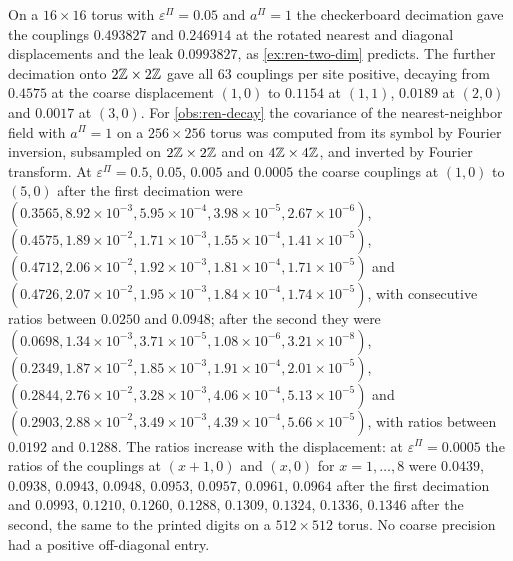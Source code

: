 \begin{numcheck}[Decimation on $\Z^2$]\label{chk:ren-two-dim}
On a $16\times16$ torus with $\varepsilon^\Pi=0.05$ and $a^\Pi=1$ the checkerboard decimation gave the couplings $0.493827$ and $0.246914$ at the rotated nearest and diagonal displacements and the leak $0.0993827$, as \cref{ex:ren-two-dim} predicts. The further decimation onto $2\mathbb{Z}\times2\mathbb{Z}$ gave all $63$ couplings per site positive, decaying from $0.4575$ at the coarse displacement $(1,0)$ to $0.1154$ at $(1,1)$, $0.0189$ at $(2,0)$ and $0.0017$ at $(3,0)$. For \cref{obs:ren-decay} the covariance of the nearest-neighbor field with $a^\Pi=1$ on a $256\times256$ torus was computed from its symbol by Fourier inversion, subsampled on $2\mathbb{Z}\times2\mathbb{Z}$ and on $4\mathbb{Z}\times4\mathbb{Z}$, and inverted by Fourier transform. At $\varepsilon^\Pi=0.5$, $0.05$, $0.005$ and $0.0005$ the coarse couplings at $(1,0)$ to $(5,0)$ after the first decimation were $(0.3565,8.92\times10^{-3},5.95\times10^{-4},3.98\times10^{-5},2.67\times10^{-6})$, $(0.4575,1.89\times10^{-2},1.71\times10^{-3},1.55\times10^{-4},1.41\times10^{-5})$, $(0.4712,2.06\times10^{-2},1.92\times10^{-3},1.81\times10^{-4},1.71\times10^{-5})$ and $(0.4726,2.07\times10^{-2},1.95\times10^{-3},1.84\times10^{-4},1.74\times10^{-5})$, with consecutive ratios between $0.0250$ and $0.0948$; after the second they were $(0.0698,1.34\times10^{-3},3.71\times10^{-5},1.08\times10^{-6},3.21\times10^{-8})$, $(0.2349,1.87\times10^{-2},1.85\times10^{-3},1.91\times10^{-4},2.01\times10^{-5})$, $(0.2844,2.76\times10^{-2},3.28\times10^{-3},4.06\times10^{-4},5.13\times10^{-5})$ and $(0.2903,2.88\times10^{-2},3.49\times10^{-3},4.39\times10^{-4},5.66\times10^{-5})$, with ratios between $0.0192$ and $0.1288$. The ratios increase with the displacement: at $\varepsilon^\Pi=0.0005$ the ratios of the couplings at $(x+1,0)$ and $(x,0)$ for $x=1,\dots,8$ were $0.0439$, $0.0938$, $0.0943$, $0.0948$, $0.0953$, $0.0957$, $0.0961$, $0.0964$ after the first decimation and $0.0993$, $0.1210$, $0.1260$, $0.1288$, $0.1309$, $0.1324$, $0.1336$, $0.1346$ after the second, the same to the printed digits on a $512\times512$ torus. No coarse precision had a positive off-diagonal entry.
\end{numcheck}

